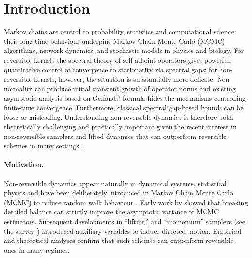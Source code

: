 \documentclass[preprint]{imsart}
\theoremstyle{plain}
\theoremstyle{definition}
\begin{document}
\section{Introduction}
Markov chains are central to probability, statistics and computational science: their long-time behaviour underpins Markov Chain Monte Carlo (MCMC) algorithms, network dynamics, and stochastic models in physics and biology. For reversible kernels the spectral theory of self-adjoint operators gives powerful, quantitative control of convergence to stationarity via spectral gaps; for non-reversible kernels, however, the situation is substantially more delicate. Non-normality can produce initial transient growth of operator norms and existing asymptotic analysis based on Gelfands' formula hides the mechanisms controlling finite-time convergence. Furthermore, classical spectral gap-based bounds can be loose or misleading. Understanding non-reversible dynamics is therefore both theoretically challenging and practically important given the recent interest in non-reversible samplers and lifted dynamics that can outperform reversible schemes in many settings \citep{diaconis2000analysis, eberle2025convergence}.
\paragraph{Motivation.}
Non-reversible dynamics appear naturally in dynamical systems, statistical physics and have been deliberately introduced in Markov Chain Monte Carlo (MCMC) to reduce random walk behaviour \cite{diaconis2000analysis,chen1999lifting}.  
Early work by \citet{Neal2004} showed that breaking detailed balance can strictly improve the asymptotic variance of MCMC estimators.  
Subsequent developments in ``lifting'' and ``momentum'' samplers (see the survey \citep{Vucelja2014}) introduced auxiliary variables to induce directed motion. Empirical and theoretical analyses confirm that such schemes can outperform reversible ones in many regimes. 
  
\end{document}

